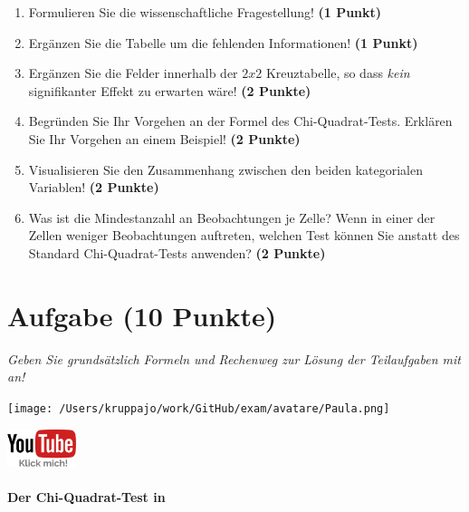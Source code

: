 \documentclass[a4paper, 9pt]{scrartcl}\usepackage[]{graphicx}\usepackage[]{xcolor}
\begin{document}
\begin{enumerate}
  \item Formulieren Sie die wissenschaftliche Fragestellung! \textbf{(1 Punkt)}
\item Ergänzen Sie die Tabelle um die fehlenden Informationen! \textbf{(1 Punkt)} 
\item Ergänzen Sie die Felder innerhalb der $2x2$ Kreuztabelle, so dass \textit{kein} signifikanter Effekt zu erwarten wäre! \textbf{(2 Punkte)}
\item Begründen Sie Ihr Vorgehen an der Formel des Chi-Quadrat-Tests. Erklären Sie Ihr Vorgehen an einem Beispiel! \textbf{(2 Punkte)}
\item Visualisieren Sie den Zusammenhang zwischen den beiden kategorialen Variablen! \textbf{(2 Punkte)}
\item Was ist die Mindestanzahl an Beobachtungen je Zelle? Wenn in einer der Zellen weniger Beobachtungen auftreten, welchen Test können Sie anstatt des Standard Chi-Quadrat-Tests anwenden? \textbf{(2 Punkte)}
\end{enumerate} 
\clearpage

\section{Aufgabe \hfill (10 Punkte)}

\textit{Geben Sie grundsätzlich Formeln und Rechenweg zur Lösung der Teilaufgaben mit an!} \\[1Ex]
 

 
\begin{minipage}[t]{0.5\textwidth}
\texttt{[image: /Users/kruppajo/work/GitHub/exam/avatare/Paula.png]}
\end{minipage}
\begin{minipage}[t]{0.5\textwidth}
\hfill
\href{https://youtu.be/ghArbetOr_E}{\includegraphics[width = 2cm]{img/youtube}}
\end{minipage}
\vspace{-3Ex}



\paragraph{Der Chi-Quadrat-Test in \Rlogo}
\end{document}
